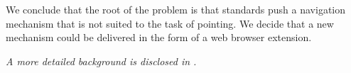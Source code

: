 \documentclass[11pt,openright,a4paper]{report}
\begin{document}
We conclude that the root of the problem is that standards push a navigation mechanism that is not suited to the task of pointing. We decide that a new mechanism could be delivered in the form of a web browser extension.

\textit{A more detailed background is disclosed in .}

\end{document}
